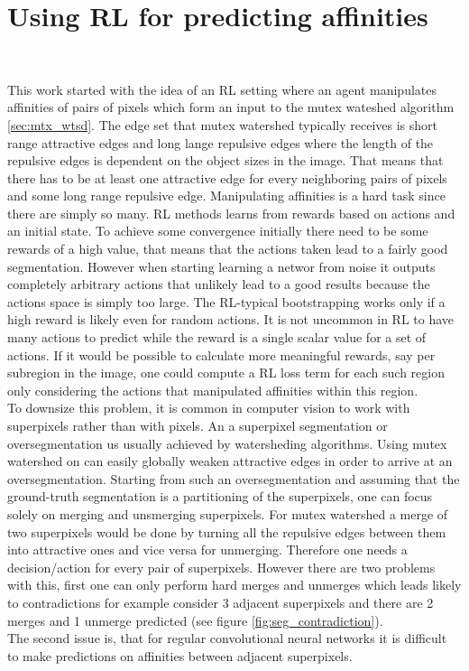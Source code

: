 \section{Using RL for predicting affinities}~\label{sec:rl_for_seg}

This work started with the idea of an RL setting where an agent manipulates affinities of pairs of pixels which form an input to the mutex wateshed algorithm \ref{sec:mtx_wtsd}. The edge set that mutex watershed typically receives is short range attractive edges and long lange repulsive edges where the length of the repulsive edges is dependent on the object sizes in the image. That means that there has to be at least one attractive edge for every neighboring pairs of pixels and some long range repulsive edge. Manipulating affinities is a hard task since there are simply so many. RL methods learns from rewards based on actions and an initial state. To achieve some convergence initially there need to be some rewards of a high value, that means that the actions taken lead to a fairly good segmentation. However when starting learning a networ from noise it outputs completely arbitrary actions that unlikely lead to a good results because the actions space is simply too large. The RL-typical bootstrapping works only if a high reward is likely even for random actions. It is not uncommon in RL to have many actions to predict while the reward is a single scalar value for a set of actions. If it would be possible to calculate more meaningful rewards, say per subregion in the image, one could compute a RL loss term for each such region only considering the actions that manipulated affinities within this region.\\

To downsize this problem, it is common in computer vision to work with superpixels \cite{10.1007/978-3-642-23094-3_3} rather than  with pixels. An a superpixel segmentation or oversegmentation us usually achieved by watersheding algorithms.
Using mutex watershed on can easily globally weaken attractive edges in order to arrive at an oversegmentation.
 Starting from such an oversegmentation and assuming that the ground-truth segmentation is a partitioning of the superpixels, one can focus solely on merging and unsmerging superpixels. For mutex watershed a merge of two superpixels would be done by turning all the repulsive edges between them into attractive ones and vice versa for unmerging. Therefore one needs a decision/action for every pair of superpixels. However there are two problems with this, first one can only perform hard merges and unmerges which leads likely to contradictions for example consider 3 adjacent superpixels and there are 2 merges and 1 unmerge predicted (see figure \ref{fig:seg_contradiction}).\\
 The second issue is, that for regular convolutional neural networks it is difficult to make predictions on affinities between adjacent superpixels.